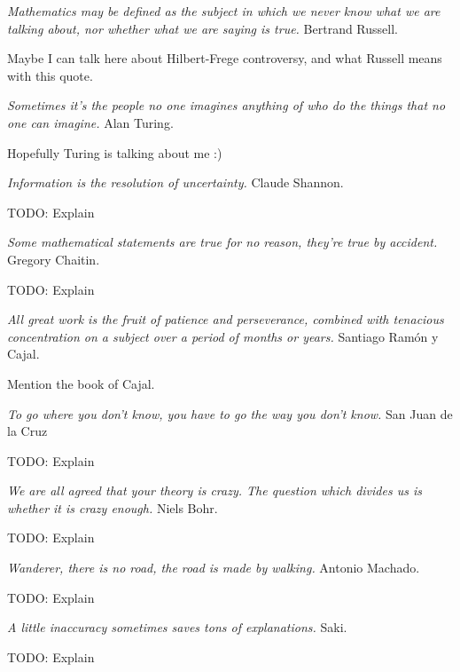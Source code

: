 \bigskip

\emph{Mathematics may be defined as the subject in which we never know what we are talking about, nor whether what we are saying is true.} Bertrand Russell.

{\color{red} Maybe I can talk here about Hilbert-Frege controversy, and what Russell means with this quote.}

\bigskip

\emph{Sometimes it’s the people no one imagines anything of who do the things that no one can imagine.} Alan Turing.

{\color{red} Hopefully Turing is talking about me :)}

\bigskip

\emph{Information is the resolution of uncertainty.} Claude Shannon.

{\color{red} TODO: Explain}

\bigskip

\emph{Some mathematical statements are true for no reason, they’re true by accident.} Gregory Chaitin.

{\color{red} TODO: Explain}

\bigskip

\emph{All great work is the fruit of patience and perseverance, combined with tenacious concentration on a subject over a period of months or years.} Santiago Ramón y Cajal.

{\color{red} Mention the book of Cajal.}

\bigskip

\emph{To go where you don’t know, you have to go the way you don’t know.} San Juan de la Cruz

{\color{red} TODO: Explain}

\bigskip

\emph{We are all agreed that your theory is crazy. The question which divides us is whether it is crazy enough.} Niels Bohr.

{\color{red} TODO: Explain}

\bigskip

\emph{Wanderer, there is no road, the road is made by walking.} Antonio Machado.

{\color{red} TODO: Explain}

\bigskip

\emph{A little inaccuracy sometimes saves tons of explanations.} Saki.

{\color{red} TODO: Explain}

\bigskip

